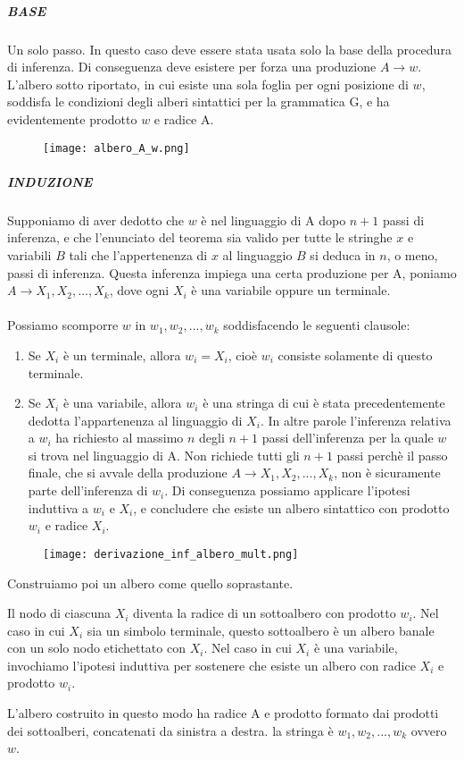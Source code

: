 \documentclass[11pt]{article}
\begin{document}
\subparagraph*{BASE} Un solo passo. In questo caso deve essere stata usata solo la base della procedura di inferenza. Di conseguenza deve esistere per forza una produzione $A \rightarrow w$. L'albero sotto riportato, in cui esiste una sola foglia per ogni posizione di $w$, soddisfa le condizioni degli alberi sintattici per la grammatica G, e ha evidentemente prodotto $w$ e radice A.

\begin{figure}[H]
\texttt{[image: albero\_A\_w.png]}
\centering
\end{figure}

\subparagraph*{INDUZIONE} Supponiamo di aver dedotto che $w$ è nel linguaggio di A dopo $n+1$ passi di inferenza, e che l'enunciato del teorema sia valido per tutte le stringhe $x$ e variabili $B$ tali che l'appertenenza di $x$ al linguaggio $B$ si deduca in $n$, o meno, passi di inferenza. Questa inferenza impiega una certa produzione per A, poniamo $A \rightarrow X_1, X_2,...,X_k$, dove ogni $X_i$ è una variabile oppure un terminale.
\\ \\
Possiamo scomporre $w$ in $w_1,w_2,...,w_k$ soddisfacendo le seguenti clausole:
\begin{enumerate}
	\item Se $X_i$ è un terminale, allora $w_i = X_i$, cioè $w_i$ consiste solamente di questo terminale.
	\item Se $X_i$ è una variabile, allora $w_i$ è una stringa di cui è stata precedentemente dedotta l'appartenenza al linguaggio di $X_i$. In altre parole l'inferenza relativa a $w_i$ ha richiesto al massimo $n$ degli $n+1$ passi dell'inferenza per la quale $w$ si trova nel linguaggio di A. Non richiede tutti gli $n+1$ passi perchè il passo finale, che si avvale della produzione $A \rightarrow X_1, X_2, ..., X_k$, non è sicuramente parte dell'inferenza di $w_i$. Di conseguenza possiamo applicare l'ipotesi induttiva a $w_i$ e $X_i$, e concludere che esiste un albero sintattico con prodotto $w_i$ e radice $X_i$.	
\end{enumerate}

\begin{figure}[H]
\texttt{[image: derivazione\_inf\_albero\_mult.png]}
\centering
\end{figure}

Construiamo poi un albero come quello soprastante.

Il nodo di ciascuna $X_i$ diventa la radice di un sottoalbero con prodotto $w_i$. Nel caso in cui $X_i$ sia un simbolo terminale, questo sottoalbero è un albero banale con un solo nodo etichettato con $X_i$. Nel caso in cui $X_i$ è una variabile, invochiamo l'ipotesi induttiva per sostenere che esiste un albero con radice  $X_i$ e prodotto $w_i$. 

L'albero costruito in questo modo ha radice A e prodotto formato dai prodotti dei sottoalberi, concatenati da sinistra a destra. la stringa è $w_1, w_2, ... ,w_k$ ovvero $w$. 
\end{document}
